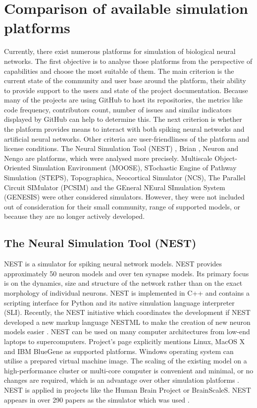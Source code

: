 \chapter{Comparison of available simulation platforms} \label{chapter:03}

Currently, there exist numerous platforms for simulation of biological neural networks. The first objective is to analyse those platforms from the perspective of capabilities and choose the most suitable of them. The main criterion is the current state of the community and user base around the platform, their ability to provide support to the users and state of the project documentation. Because many of the projects are using GitHub to host its repositories, the metrics like code frequency, contributors count, number of issues and similar indicators displayed by GitHub can help to determine this. The next criterion is whether the platform provides means to interact with both spiking neural networks and artificial neural networks. Other criteria are user-friendliness of the platform and license conditions. The Neural Simulation Tool (NEST) \cite{jordanNEST182019}, Brian \cite{stimbergBrianIntuitiveEfficient2019}, Neuron \cite{carnevaleNEURONBook06} and Nengo \cite{bekolayNengoPythonTool2014} are platforms, which were analysed more precisely. Multiscale Object-Oriented Simulation Environment (MOOSE), STochastic Engine of Pathway Simulation (STEPS), Topographica, Neocortical Simulator (NCS), The Parallel Circuit SIMulator (PCSIM) and the GEneral NEural SImulation System (GENESIS) were other considered simulators. However, they were not included out of consideration for their small community, range of supported models, or because they are no longer actively developed.

\section{The Neural Simulation Tool (NEST)}

NEST is a simulator for spiking neural network models. NEST provides approximately 50 neuron models and over ten synapse models. Its primary focus is on the dynamics, size and structure of the network rather than on the exact morphology of individual neurons. NEST is implemented in C++ and contains a scripting interface for Python and its native simulation language interpreter (SLI). Recently, the NEST initiative which coordinates the development if NEST developed a new markup language NESTML to make the creation of new neuron models easier \cite{plotnikovNESTMLModelingLanguage2016}.  NEST can be used on many computer architectures from low-end laptops to supercomputers. Project's page explicitly mentions Linux, MacOS X and IBM BlueGene as supported platforms. Windows operating system can utilise a prepared virtual machine image. The scaling of the existing model on a high-performance cluster or multi-core computer is convenient and minimal, or no changes are required, which is an advantage over other simulation platforms \cite{tikidji-hamburyanSoftwareBrainNetwork2017}. NEST is applied in projects like the Human Brain Project or BrainScaleS. NEST appears in over 290 papers as the simulator which was used \cite{julichaachenresearchallianceNESTNeuralSimulation2015}.

